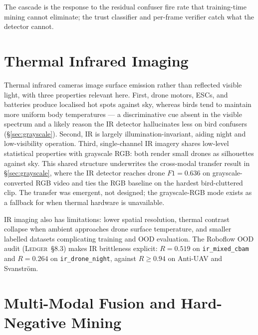 The cascade is the response to the residual confuser fire rate that training-time mining cannot eliminate; the trust classifier and per-frame verifier catch what the detector cannot.

\section{Thermal Infrared Imaging}
\label{sec:lit_ir}

Thermal infrared cameras image surface emission rather than reflected visible light, with three properties relevant here. First, drone motors, ESCs, and batteries produce localised hot spots against sky, whereas birds tend to maintain more uniform body temperatures --- a discriminative cue absent in the visible spectrum and a likely reason the IR detector hallucinates less on bird confusers (\S\ref{sec:grayscale}). Second, IR is largely illumination-invariant, aiding night and low-visibility operation. Third, single-channel IR imagery shares low-level statistical properties with grayscale RGB: both render small drones as silhouettes against sky. This shared structure underwrites the cross-modal transfer result in \S\ref{sec:grayscale}, where the IR detector reaches drone $F1=0.636$ on grayscale-converted RGB video and ties the RGB baseline on the hardest bird-cluttered clip. The transfer was emergent, not designed; the grayscale-RGB mode exists as a fallback for when thermal hardware is unavailable.

IR imaging also has limitations: lower spatial resolution, thermal contrast collapse when ambient approaches drone surface temperature, and smaller labelled datasets complicating training and OOD evaluation. The Roboflow OOD audit (\textsc{Ledger}~\S8.3) makes IR brittleness explicit: $R=0.519$ on \texttt{ir\_mixed\_cbam} and $R=0.264$ on \texttt{ir\_drone\_night}, against $R\geq 0.94$ on Anti-UAV and Svanstr\"om.

\section{Multi-Modal Fusion and Hard-Negative Mining}
\label{sec:lit_fusion}

